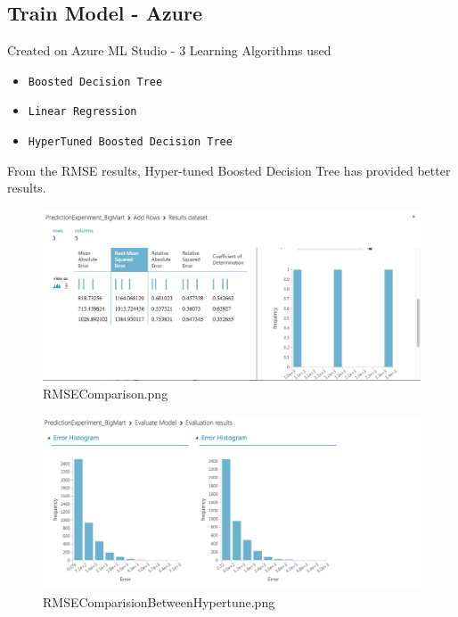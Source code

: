 \subsection{Train Model - Azure}
Created on Azure ML Studio - 3 Learning Algorithms used
\begin{itemize}
\item \verb|Boosted Decision Tree|
\item \verb|Linear Regression|
\item \verb|HyperTuned Boosted Decision Tree|
\end{itemize}

From the RMSE results, Hyper-tuned Boosted Decision Tree has provided better 
results.

\begin{figure}[pic3]
	\centering\includegraphics[width=\columnwidth]{Images/mlstudio/RMSEComparison.png}
	\caption{RMSEComparison.png}\label{fig:RMSEComparison}
\end{figure}

\begin{figure}[pic4]
	\centering\includegraphics[width=\columnwidth]{Images/mlstudio/RMSEComparisionBetweenHypertune.png}
	\caption{RMSEComparisionBetweenHypertune.png}\label{fig:RMSEComparisionBetweenHypertune}
\end{figure}

